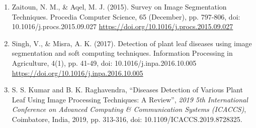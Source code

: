 \documentclass[twocolumn,10pt]{article}
\begin{document}
\begin{multicols}{2}
\begin{flushleft}
\begin{enumerate}
	\item Zaitoun, N. M., \& Aqel, M. J. (2015). Survey on Image Segmentation Techniques. Procedia Computer Science, 65 (December), pp. 797-806, doi: 10.1016/j.procs.2015.09.027 \url{https://doi.org/10.1016/j.procs.2015.09.027}
	\item Singh, V., \& Misra, A. K. (2017). Detection of plant leaf diseases using image segmentation and soft computing techniques. Information Processing in Agriculture, 4(1), pp. 41-49, doi: 10.1016/j.inpa.2016.10.005 \url{https://doi.org/10.1016/j.inpa.2016.10.005}
	\item S. S. Kumar and B. K. Raghavendra, \enquote{Diseases Detection of Various Plant Leaf Using Image Processing Techniques: A Review}, \textit{2019 5th International Conference on Advanced Computing \& Communication Systems (ICACCS)}, Coimbatore, India, 2019, pp. 313-316, doi: 10.1109/ICACCS.2019.8728325.
\end{enumerate}
\end{flushleft}
\end{multicols}
\end{document}
